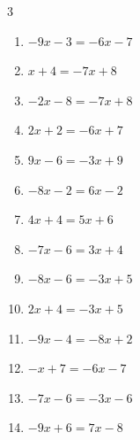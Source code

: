 \begin{multicols}{3}
\begin{enumerate}
  \item $-9x-3=-6x-7$


  \item $x+4=-7x+8$


\columnbreak %

  \item $-2x-8=-7x+8$


  \item $2x+2=-6x+7$


  \item $9x-6=-3x+9$


  \item $-8x-2=6x-2$

        \phantom{$\displaystyle x=0$}

  \item $4x+4=5x+6$

        \phantom{$\displaystyle x=-2$}

  \item $-7x-6=3x+4$

        \phantom{$\displaystyle x=-1$}

  \item $-8x-6=-3x+5$


  \item $2x+4=-3x+5$


  \item $-9x-4=-8x+2$

        \phantom{$\displaystyle x=-6$}

  \item $-x+7=-6x-7$


  \item $-7x-6=-3x-6$

        \phantom{$\displaystyle x=0$}

  \item $-9x+6=7x-8$


\end{enumerate}
\end{multicols}
